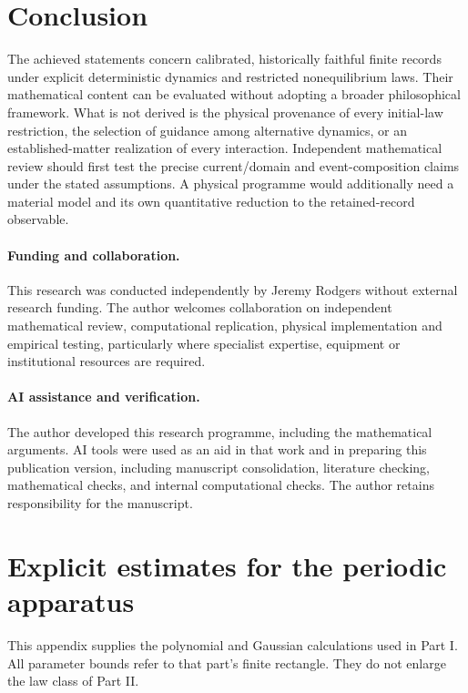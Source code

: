 \documentclass[11pt]{article}
\theoremstyle{definition}\newtheorem{definition}[theorem]{Definition}
\theoremstyle{remark}\newtheorem{remark}[theorem]{Remark}
\begin{document}
\section{Conclusion}
The achieved statements concern calibrated, historically faithful
finite records under explicit deterministic dynamics and restricted
nonequilibrium laws. Their mathematical content can be evaluated
without adopting a broader philosophical framework. What is not
derived is the physical provenance of every initial-law restriction,
the selection of guidance among alternative dynamics, or an
established-matter realization of every interaction. Independent
mathematical review should first test the precise current/domain and
event-composition claims under the stated assumptions. A physical
programme would additionally need a material model and its own
quantitative reduction to the retained-record observable.

\paragraph{Funding and collaboration.}
This research was conducted independently by Jeremy Rodgers without
external research funding. The author welcomes collaboration on
independent mathematical review, computational replication,
physical implementation and empirical testing, particularly where
specialist expertise, equipment or institutional resources are required.

\paragraph{AI assistance and verification.}
The author developed this research programme, including
the mathematical arguments. AI tools were used as an aid in that work and in preparing this
publication version, including manuscript consolidation, literature checking, mathematical checks,
and internal computational checks. The author retains responsibility for the manuscript.

\clearpage
\appendix

\section{Explicit estimates for the periodic apparatus}\label{app:periodic}
This appendix supplies the polynomial and Gaussian calculations used in
Part I. All parameter bounds refer to that part's finite rectangle.
They do not enlarge the law class of Part II.
\end{document}

